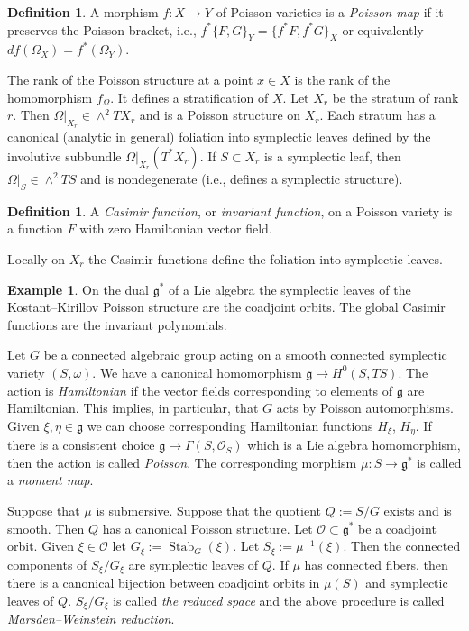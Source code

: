 \documentclass[12pt,a4paper,oneside,english]{smfart}
\theoremstyle{definition}
\newtheorem{defn}[thm]{Definition}
\newtheorem{exmp}[thm]{Example}
\theoremstyle{remark}
\DeclareMathOperator{\Stab}{Stab}
\newcommand{\cO}{\mathcal{O}}
\begin{document}
\begin{defn}\label{t5.6}
A morphism $f \colon X \to Y$ of Poisson varieties is a \emph{Poisson map} if it preserves the Poisson bracket, i.e., $f^*\{F, G\}_Y = \{f^*F, f^*G\}_X$ or equivalently $df(\Omega_X) = f^*(\Omega_Y)$.
\end{defn}

The rank of the Poisson structure at a point $x \in X$ is the rank of the homomorphism $f_\Omega$. It defines a stratification of $X$. Let $X_r$ be the stratum of rank $r$. Then $\Omega|_{X_r} \in \wedge^2 TX_r$ and is a Poisson structure on $X_r$. Each stratum has a canonical (analytic in general) foliation into symplectic leaves defined by the involutive subbundle $\Omega|_{X_r}(T^*X_r)$. If $S \subset X_r$ is a symplectic leaf, then $\Omega|_S \in \wedge^2 TS$ and is nondegenerate (i.e., defines a symplectic structure).

\begin{defn}\label{t5.7}
A \emph{Casimir function}, or \emph{invariant function}, on a Poisson variety is a function $F$ with zero Hamiltonian vector field.
\end{defn}

Locally on $X_r$ the Casimir functions define the foliation into symplectic leaves.

\begin{exmp}\label{t5.8}
On the dual $\mathfrak{g}^*$ of a Lie algebra the symplectic leaves of the Kostant--Kirillov Poisson structure are the coadjoint orbits. The global Casimir functions are the invariant polynomials.
\end{exmp}

Let $G$ be a connected algebraic group acting on a smooth connected symplectic variety $(S, \omega)$. We have a canonical homomorphism $\mathfrak{g} \to H^0(S, TS)$. The action is \emph{Hamiltonian} if the vector fields corresponding to elements of $\mathfrak{g}$ are Hamiltonian. This implies, in particular, that $G$ acts by Poisson automorphisms. Given $\xi, \eta \in \mathfrak{g}$ we can choose corresponding Hamiltonian functions $H_\xi$, $H_\eta$. If there is a consistent choice $\mathfrak{g} \to \Gamma(S, \cO_S)$ which is a Lie algebra homomorphism, then the action is called \emph{Poisson}. The corresponding morphism $\mu \colon S \to \mathfrak{g}^*$ is called a \emph{moment map}.

Suppose that $\mu$ is submersive. Suppose that the quotient $Q := S/G$ exists and is smooth. Then $Q$ has a canonical Poisson structure. Let $\mathcal{O} \subset \mathfrak{g}^*$ be a coadjoint orbit. Given $\xi \in \mathcal{O}$ let $G_\xi := \Stab_G(\xi)$. Let $S_\xi := \mu^{-1}(\xi)$. Then the connected components of $S_\xi / G_\xi$ are symplectic leaves of $Q$. If $\mu$ has connected fibers, then there is a canonical bijection between coadjoint orbits in $\mu(S)$ and symplectic leaves of $Q$. $S_\xi / G_\xi$ is called \emph{the reduced space} and the above procedure is called \emph{Marsden--Weinstein reduction}.
\end{document}
